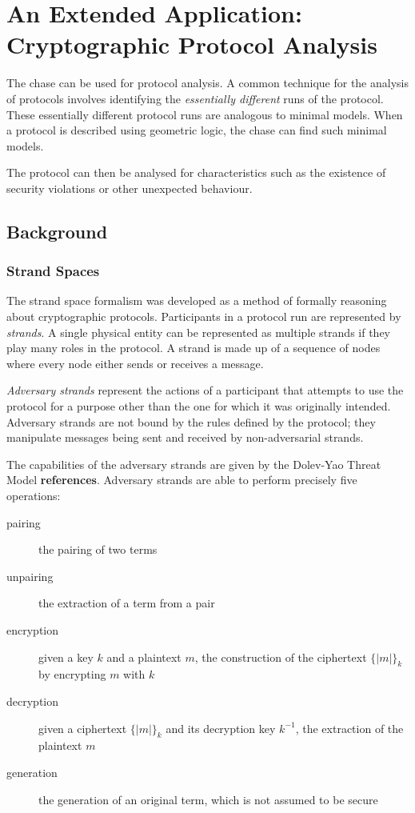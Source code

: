 \section{An Extended Application: \\ Cryptographic Protocol Analysis}

	The chase can be used for protocol analysis. A common technique for the analysis
	of protocols involves identifying the \emph{essentially different} runs of
	the protocol. These essentially different protocol runs are analogous to
	minimal models. When a protocol is described using geometric logic, the
	chase can find such minimal models.

	The protocol can then be analysed for characteristics such as the
	existence of security violations or other unexpected behaviour.

	\subsection{Background}

		\subsubsection{Strand Spaces}

			The strand space formalism was developed as a method of formally
			reasoning about cryptographic protocols. Participants in a protocol
			run are represented by \emph{strands}. A single physical entity can
			be represented as multiple strands if they play many roles in the
			protocol. A strand is made up of a sequence of nodes where every
			node either sends or receives a message.

			\emph{Adversary strands} represent the actions of a participant
			that attempts to use the protocol for a purpose other than the one
			for which it was originally intended. Adversary strands are not
			bound by the rules defined by the protocol; they manipulate
			messages being sent and received by non-adversarial strands.

			The capabilities of the adversary strands are given by the
			Dolev-Yao Threat Model \textbf{references}. Adversary strands are
			able to perform precisely five operations:

			\begin{description}
			\item [pairing] the pairing of two terms
			\item [unpairing] the extraction of a term from a pair
			\item [encryption] given a key $k$ and a plaintext $m$, the construction of the ciphertext $\{|m|\}_k$ by encrypting $m$ with $k$
			\item [decryption] given a ciphertext $\{|m|\}_k$ and its decryption key $k^{-1}$, the extraction of the plaintext $m$
			\item [generation] the generation of an original term, which is not assumed to be secure
			\end{description}

